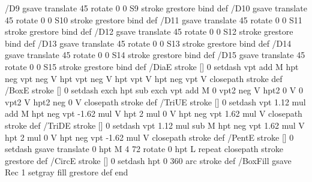 {/D9 { gsave translate 45 rotate 0 0 S9 stroke grestore } bind def
/D10 { gsave translate 45 rotate 0 0 S10 stroke grestore } bind def
/D11 { gsave translate 45 rotate 0 0 S11 stroke grestore } bind def
/D12 { gsave translate 45 rotate 0 0 S12 stroke grestore } bind def
/D13 { gsave translate 45 rotate 0 0 S13 stroke grestore } bind def
/D14 { gsave translate 45 rotate 0 0 S14 stroke grestore } bind def
/D15 { gsave translate 45 rotate 0 0 S15 stroke grestore } bind def
/DiaE { stroke [] 0 setdash vpt add M
  hpt neg vpt neg V hpt vpt neg V
  hpt vpt V hpt neg vpt V closepath stroke } def
/BoxE { stroke [] 0 setdash exch hpt sub exch vpt add M
  0 vpt2 neg V hpt2 0 V 0 vpt2 V
  hpt2 neg 0 V closepath stroke } def
/TriUE { stroke [] 0 setdash vpt 1.12 mul add M
  hpt neg vpt -1.62 mul V
  hpt 2 mul 0 V
  hpt neg vpt 1.62 mul V closepath stroke } def
/TriDE { stroke [] 0 setdash vpt 1.12 mul sub M
  hpt neg vpt 1.62 mul V
  hpt 2 mul 0 V
  hpt neg vpt -1.62 mul V closepath stroke } def
/PentE { stroke [] 0 setdash gsave
  translate 0 hpt M 4 {72 rotate 0 hpt L} repeat
  closepath stroke grestore } def
/CircE { stroke [] 0 setdash 
  hpt 0 360 arc stroke } def
/BoxFill { gsave Rec 1 setgray fill grestore } def
end
}
